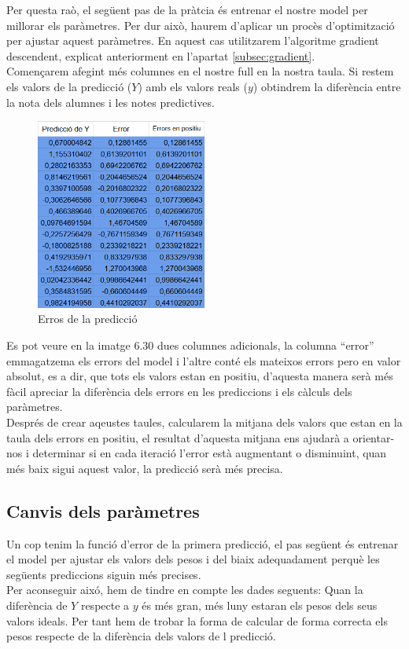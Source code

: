 Per questa raò, el següent pas de la pràtcia és entrenar el nostre model per millorar els paràmetres. Per dur això, haurem d'aplicar un procès d'optimització per ajustar aquest paràmetres. En aquest cas utilitzarem l'algoritme gradient descendent, explicat anteriorment en l'apartat \ref{subsec:gradient}.\\

Començarem afegint més columnes en el nostre full en la nostra taula. Si restem els valors de la predicció ($Y$) amb els valors reals ($y$) obtindrem la diferència entre la nota dels alumnes i les notes predictives.

\begin{figure}[H]
    \centering
    \includegraphics[width=0.5\textwidth]{./figures/Errors.png}
    \caption{Erros de la predicció}
\end{figure}

Es pot veure en la imatge 6.30 dues columnes adicionals, la columna ``error'' emmagatzema els errors del model i l'altre conté els mateixos errors pero en valor absolut, es a dir, que tots els valors estan en positiu, d'aquesta manera serà més fàcil apreciar la diferència dels errors en les prediccions i els càlculs dels paràmetres.\\

Després de crear aqeustes taules, calcularem la mitjana dels valors que estan en la taula dels errors en positiu, el resultat d'aquesta mitjana ens ajudarà a orientar-nos i determinar si en cada iteració l'error està augmentant o disminuint, quan més baix sigui aquest valor, la predicció serà més precisa.\\
\subsection{Canvis dels paràmetres}
Un cop tenim la funció d'error de la primera predicció, el pas següent és entrenar el model per ajustar els valors dels pesos i del biaix adequadament perquè les següents prediccions siguin més precises.\\
Per aconseguir aixó, hem de tindre en compte les dades seguents: Quan la diferència de $Y$ respecte a $y$ és més gran, més luny estaran els pesos dels seus valors ideals. Per tant hem de trobar la forma de calcular de forma correcta els pesos respecte de la diferència dels valors de l predicció.

